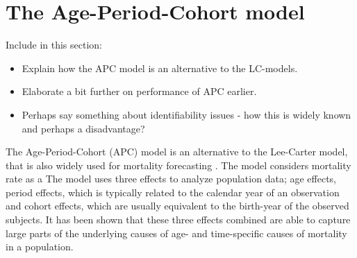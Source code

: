 \newpage
\section{The Age-Period-Cohort model}
\label{sec:APC-model}
\textcolor{myDarkGreen}{
Include in this section:
\begin{itemize}
    \item Explain how the APC model is an alternative to the LC-models.
    \item Elaborate a bit further on performance of APC earlier. 
    \item Perhaps say something about identifiability issues - how this is widely known and perhaps a disadvantage?
\end{itemize}
}
The Age-Period-Cohort (APC) model is an alternative to the Lee-Carter model, that is also widely used for mortality forecasting \cite{rieblerHeld2010}. The model considers mortality rate as a 
The model uses three effects to analyze population data; age effects, period effects, which is typically related to the calendar year of an observation and cohort effects, which are usually equivalent to the birth-year of the observed subjects. It has been shown that these three effects combined are able to capture large parts of the underlying causes of age- and time-specific causes of mortality in a population. 

